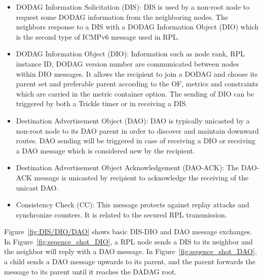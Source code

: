 \begin{itemize}
\item DODAG Information Solicitation (DIS): DIS is used by a non-root node to request some DODAG information from the neighboring nodes. The neighbors response to a DIS with a DODAG Information Object (DIO) which is the second type of ICMPv6 message used in RPL.
\newline

\item DODAG Information Object (DIO): Information such as node rank, RPL instance ID, DODAG version number are communicated between nodes within DIO messages. It allows the recipient to join a DODAG and choose its parent set and preferable parent according to the OF, metrics and constraints which are carried in the metric container option. The sending of DIO can be triggered by both a Trickle timer or in receiving a DIS.
\newline

\item Destination Advertisement Object (DAO): DAO is typically unicasted by a non-root node to its DAO parent in order to discover and maintain downward routes. DAO sending will be triggered in case of receiving a DIO or receiving a DAO message which is considered new by the recipient.
\newline

\item Destination Advertisement Object Acknowledgement (DAO-ACK): The DAO-ACK message is unicasted by recipient to acknowledge the receiving of the unicast DAO.
\newline

\item Consistency Check (CC): This message protects against replay attacks and synchronize counters. It is related to the secured RPL transmission.
\end{itemize}

Figure~\ref{fig:DIS/DIO/DAO} shows basic DIS-DIO and DAO message exchanges. In Figure~\ref{fig:seqence_shot_DIO}, a RPL node sends a DIS to its neighbor and the neighbor will reply with a DAO message. In Figure~\ref{fig:seqence_shot_DAO}, a child sends a DAO message upwards to its parent, and the parent forwards the message to its parent until it reaches the DADAG root.  

